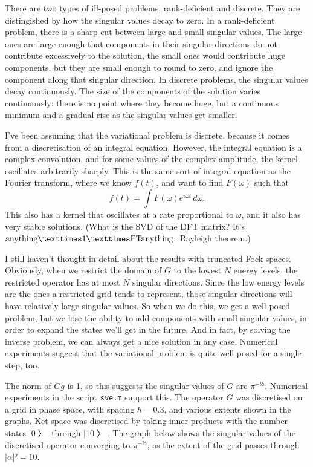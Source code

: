 There are two types of ill-posed problems, rank-deficient and discrete.  They are distingished by how the singular values decay to zero.  In a rank-deficient problem, there is a sharp cut between large and small singular values.  The large ones are large enough that components in their singular directions do not contribute excessively to the solution, the small ones would contribute huge components, but they are small enough to round to zero, and ignore the component along that singular direction.  In discrete problems, the singular values decay continuously.  The size of the components of the solution varies continuously: there is no point where they become huge, but a continuous minimum and a gradual rise as the singular values get smaller.

I've been assuming that the variational problem is discrete, because it comes from a discretisation of an integral equation.  However, the integral equation is a complex convolution, and for some values of the complex amplitude, the kernel oscillates arbitrarily sharply.  This is the same sort of integral equation as the Fourier transform, where we know $f(t)$, and want to find $F(ω)$ such that
$$f(t)=\int F(ω)e^{iωt}\,dω.$$
This also has a kernel that oscillates at a rate proportional to $ω$, and it also has very stable solutions.  (What is the SVD of the DFT matrix?  It's ${\rm anything}×1×{\rm FT anything}$: Rayleigh theorem.)


I still haven't thought in detail about the results with truncated Fock spaces.  Obviously, when we restrict the domain of $G$ to the lowest $N$ energy levels, the restricted operator has at most $N$ singular directions.  Since the low energy levels are the ones a restricted grid tends to represent, those singular directions will have relatively large singular values.  So when we do this, we get a well-posed problem, but we lose the ability to add components with small singular values, in order to expand the states we'll get in the future.  And in fact, by solving the inverse problem, we can always get a nice solution in any case.  Numerical experiments suggest that the variational problem is quite well posed for a single step, too.

The norm of $Gg$ is 1, so this suggests the singular values of $G$ are $π^{-½}$.  Numerical experiments in the script {\tt sve.m} support this.  The operator $G$ was discretised on a grid in phase space, with spacing $h=0.3$, and various extents shown in the graphs.  Ket space was discretised by taking inner products with the number states $|0〉$ through $|10〉$.  The graph below shows the singular values of the discretised operator converging to $π^{-½}$, as the extent of the grid passes through $|α|²=10$.

